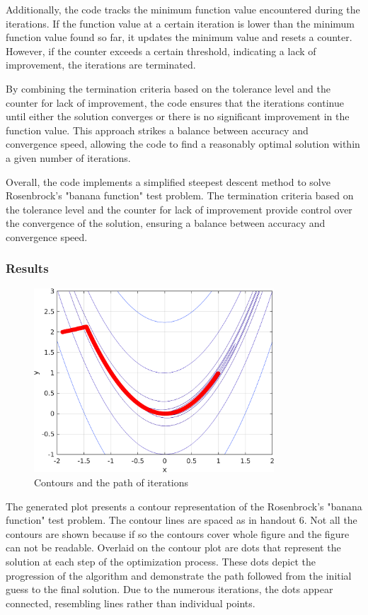 \documentclass[12pt, a4paper]{article}
\numberwithin{equation}{section}
\begin{document}
Additionally, the code tracks the minimum function value encountered during the iterations. If the function value at a certain iteration is lower than the minimum function value found so far, it updates the minimum value and resets a counter. However, if the counter exceeds a certain threshold, indicating a lack of improvement, the iterations are terminated.

By combining the termination criteria based on the tolerance level and the counter for lack of improvement, the code ensures that the iterations continue until either the solution converges or there is no significant improvement in the function value. This approach strikes a balance between accuracy and convergence speed, allowing the code to find a reasonably optimal solution within a given number of iterations.

Overall, the code implements a simplified steepest descent method to solve Rosenbrock's "banana function" test problem. The termination criteria based on the tolerance level and the counter for lack of improvement provide control over the convergence of the solution, ensuring a balance between accuracy and convergence speed.

\newpage

\subsubsection{Results}

\begin{figure}[H]
  \centering
  \includegraphics[width=0.8\textwidth]{img/path.png}
  \captionsetup{justification=centering}
  \caption{Contours and the path of iterations}
\end{figure}

The generated plot presents a contour representation of the Rosenbrock's "banana function" test problem. The contour lines are spaced as in handout 6. Not all the contours are shown because if so the contours cover whole figure and the figure can not be readable. Overlaid on the contour plot are dots that represent the solution at each step of the optimization process. These dots depict the progression of the algorithm and demonstrate the path followed from the initial guess to the final solution. Due to the numerous iterations, the dots appear connected, resembling lines rather than individual points.
\end{document}
